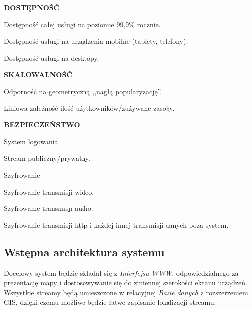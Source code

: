 \begin{packed_item}
{\begin{packed_item}
        \end{packed_item}
    }
    \item{
        \textbf{DOSTĘPNOŚĆ}
        \begin{packed_item}
            \item{Dostępność całej usługi na poziomie 99,9\% rocznie.}
            \item{Dostępność usługi na urządzenia mobilne (tablety, telefony).}
            \item{Dostępność usługi na desktopy.}
        \end{packed_item}
    }
    \item{
        \textbf{SKALOWALNOŚĆ}
        \begin{packed_item}
            \item{Odporność na geometryczną ,,nagłą popularyzację''.}
            \item{Liniowa zależność ilość użytkowników/zużywane zasoby.}
        \end{packed_item}
    }
    \item{
        \textbf{BEZPIECZEŃSTWO}
        \begin{packed_item}
            \item{
                System logowania.
            }
            \item{
                Stream publiczny/prywatny.
            }
            \item{
                Szyfrowanie
                \begin{packed_item}
                    \item{Szyfrowanie transmisji wideo.}
                    \item{Szyfrowanie transmisji audio.}
                    \item{Szyfrowanie transmisji http i każdej innej transmisji danych poza system.}
                \end{packed_item}
            }
        \end{packed_item}
    }
\end{packed_item}

\subsection{Wstępna architektura systemu}
\label{sec:EtapIwstepnaArchitekturaSystemu}

Docelowy system będzie składał się z \textit{Interfejsu WWW}, odpowiedzialnego za prezentację mapy i dostosowywanie się do zmiennej szerokości ekranu urządzeń. Wszystkie streamy będą umieszczone w relacyjnej \textit{Bazie danych} z rozszerzeniem GIS, dzięki czemu możliwe będzie łatwe zapisanie lokalizacji streamu.

